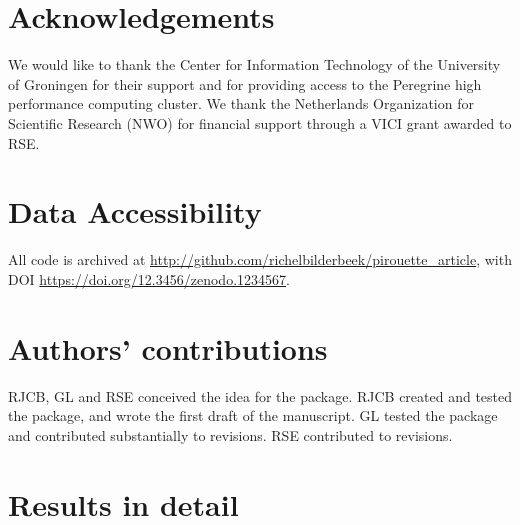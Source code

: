 \documentclass{article}
\begin{document}
\section{Acknowledgements}

We would like to thank the Center for Information Technology of the University 
of Groningen for their support and for providing access to the Peregrine 
high performance computing cluster. 
We thank the Netherlands 
Organization for Scientific Research (NWO) for financial support 
through a VICI grant awarded to RSE.

\section{Data Accessibility}

All code is archived at \url{http://github.com/richelbilderbeek/pirouette_article},
with DOI \url{https://doi.org/12.3456/zenodo.1234567}.

\section{Authors' contributions}

RJCB, GL and RSE conceived the idea for the package. 
RJCB created and tested the package, and wrote the first draft of the manuscript.
GL tested the package and contributed substantially to revisions.
RSE contributed to revisions.




\appendix

\section{Results in detail}
\end{document}
